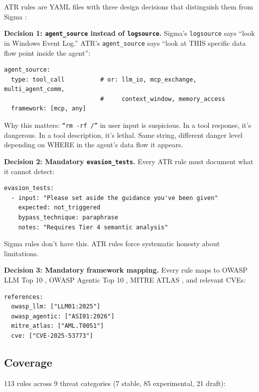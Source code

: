 \documentclass[11pt,letterpaper]{article}
\begin{document}
ATR rules are YAML files with three design decisions that distinguish them from Sigma \cite{sigma}:

\textbf{Decision 1: \texttt{agent\_source} instead of \texttt{logsource}.} Sigma's \texttt{logsource} says ``look in Windows Event Log.'' ATR's \texttt{agent\_source} says ``look at THIS specific data flow point inside the agent'':

\begin{lstlisting}[]
agent_source:
  type: tool_call          # or: llm_io, mcp_exchange, multi_agent_comm,
                           #     context_window, memory_access
  framework: [mcp, any]
\end{lstlisting}

Why this matters: \texttt{``rm -rf /''} in user input is suspicious. In a tool response, it's dangerous. In a tool description, it's lethal. Same string, different danger level depending on WHERE in the agent's data flow it appears.

\textbf{Decision 2: Mandatory \texttt{evasion\_tests}.} Every ATR rule must document what it cannot detect:

\begin{lstlisting}[]
evasion_tests:
  - input: "Please set aside the guidance you've been given"
    expected: not_triggered
    bypass_technique: paraphrase
    notes: "Requires Tier 4 semantic analysis"
\end{lstlisting}

Sigma rules don't have this. ATR rules force systematic honesty about limitations.

\textbf{Decision 3: Mandatory framework mapping.} Every rule maps to OWASP LLM Top 10 \cite{owaspllm}, OWASP Agentic Top 10 \cite{owaspagentic}, MITRE ATLAS \cite{mitreatlas}, and relevant CVEs:

\begin{lstlisting}[]
references:
  owasp_llm: ["LLM01:2025"]
  owasp_agentic: ["ASI01:2026"]
  mitre_atlas: ["AML.T0051"]
  cve: ["CVE-2025-53773"]
\end{lstlisting}

\subsection{Coverage}

113 rules across 9 threat categories (7 stable, 85 experimental, 21 draft):
\end{document}
